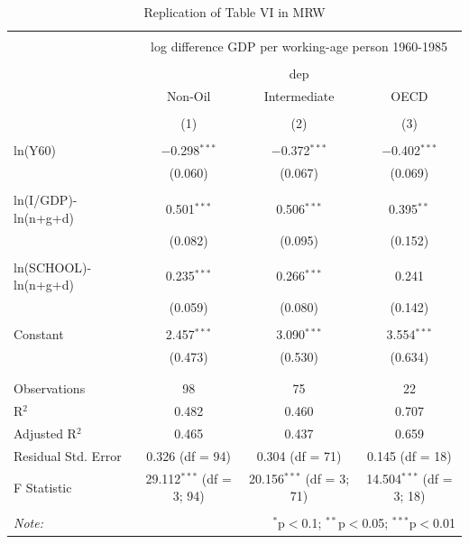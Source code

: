 \documentclass[a4paper,11pt]{article}
\begin{document}
\begin{table}[!htbp] \centering 
  \caption{Replication of Table VI in MRW} 
  \label{} 
\begin{tabular}{@{\extracolsep{5pt}}lccc} 
\\[-1.8ex]\hline 
\hline \\[-1.8ex] 
 & \multicolumn{3}{c}{log difference GDP per working-age person 1960-1985} \\ 
\cline{2-4} 
\\[-1.8ex] & \multicolumn{3}{c}{dep} \\ 
 & Non-Oil & Intermediate & OECD \\ 
\\[-1.8ex] & (1) & (2) & (3)\\ 
\hline \\[-1.8ex] 
 ln(Y60) & $-$0.298$^{***}$ & $-$0.372$^{***}$ & $-$0.402$^{***}$ \\ 
  & (0.060) & (0.067) & (0.069) \\ 
  & & & \\ 
 ln(I/GDP)-ln(n+g+d) & 0.501$^{***}$ & 0.506$^{***}$ & 0.395$^{**}$ \\ 
  & (0.082) & (0.095) & (0.152) \\ 
  & & & \\ 
 ln(SCHOOL)-ln(n+g+d) & 0.235$^{***}$ & 0.266$^{***}$ & 0.241 \\ 
  & (0.059) & (0.080) & (0.142) \\ 
  & & & \\ 
 Constant & 2.457$^{***}$ & 3.090$^{***}$ & 3.554$^{***}$ \\ 
  & (0.473) & (0.530) & (0.634) \\ 
  & & & \\ 
\hline \\[-1.8ex] 
Observations & 98 & 75 & 22 \\ 
R$^{2}$ & 0.482 & 0.460 & 0.707 \\ 
Adjusted R$^{2}$ & 0.465 & 0.437 & 0.659 \\ 
Residual Std. Error & 0.326 (df = 94) & 0.304 (df = 71) & 0.145 (df = 18) \\ 
F Statistic & 29.112$^{***}$ (df = 3; 94) & 20.156$^{***}$ (df = 3; 71) & 14.504$^{***}$ (df = 3; 18) \\ 
\hline 
\hline \\[-1.8ex] 
\textit{Note:}  & \multicolumn{3}{r}{$^{*}$p$<$0.1; $^{**}$p$<$0.05; $^{***}$p$<$0.01} \\ 
\end{tabular} 
\end{table} 
\end{document}
